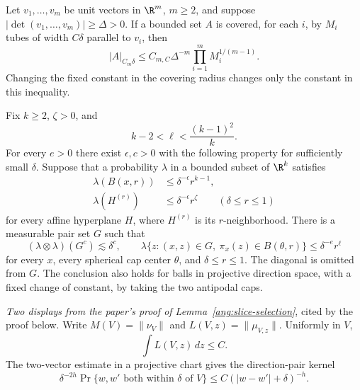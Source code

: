 \documentclass[11pt,reqno]{amsart}
\begin{document}
\begin{lemma}\label{ang:loomis-whitney}
Let $v_1,\ldots,v_m$ be unit vectors in $\R^m$, $m\ge2$, and suppose
$|\det(v_1,\ldots,v_m)|\ge\Delta>0$. If a bounded set $A$ is covered,
for each $i$, by $M_i$ tubes of width $C\delta$ parallel to $v_i$, then
\[
 |A|_{C_m\delta}\le C_{m,C}\Delta^{-m}
       \prod_{i=1}^m M_i^{1/(m-1)}.
\]
Changing the fixed constant in the covering radius changes only the
constant in this inequality.
\end{lemma}

\begin{lemma}\label{ang:weak-radial}
Fix $k\ge2$, $\zeta>0$, and
\[
 k-2<\ell<\frac{(k-1)^2}{k}.
\]
For every $e>0$ there exist $\epsilon,c>0$ with the following property
for sufficiently small $\delta$. Suppose that a probability $\lambda$
in a bounded subset of $\R^k$ satisfies
\begin{align*}
 \lambda(B(x,r))&\le\delta^{-\epsilon}r^{k-1},\\
 \lambda(H^{(r)})&\le\delta^{-\epsilon}r^\zeta
 \qquad(\delta\le r\le1)
\end{align*}
for every affine hyperplane $H$, where $H^{(r)}$ is its $r$-neighborhood.
There is a measurable pair set $G$ such that
\[
 (\lambda\otimes\lambda)(G^c)\lesssim\delta^c,
 \qquad
 \lambda\{z:(x,z)\in G,\ \pi_x(z)\in B(\theta,r)\}
       \le\delta^{-e}r^\ell
\]
for every $x$, every spherical cap center $\theta$, and
$\delta\le r\le1$. The diagonal is omitted from $G$. The conclusion
also holds for balls in projective direction space, with a fixed change
of constant, by taking the two antipodal caps.
\end{lemma}

\medskip\noindent\emph{Two displays from the paper's proof of Lemma~\ref{ang:slice-selection}}, cited by the proof below. Write $M(V)=\|\nu_V\|$ and $L(V,z)=\|\mu_{V,z}\|$. Uniformly in $V$,
\begin{equation}\label{ang:point-slice-total}
 \int L(V,z)\,dz\le C.
\end{equation}
The two-vector estimate in a projective chart gives the direction-pair kernel
\begin{equation}\label{ang:direction-pair-kernel}
 \delta^{-2h}\Pr\{w,w'\text{ both within }\delta\text{ of }V\}
       \le C(|w-w'|+\delta)^{-h}.
\end{equation}
\end{document}
